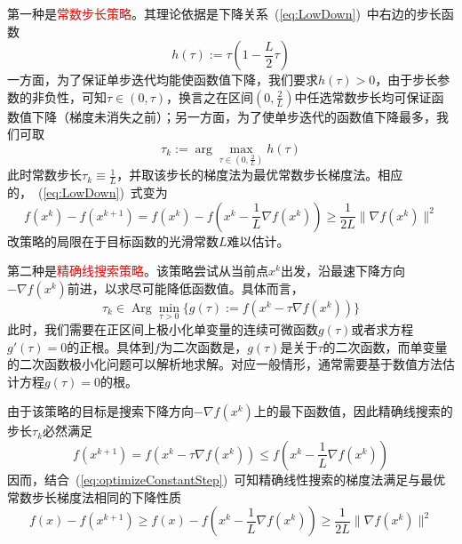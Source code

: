第一种是\textcolor{red}{常数步长策略}。其理论依据是下降关系~(\ref{eq:LowDown})~中右边的步长函数
\[
    h(\tau) :=\tau(1-\frac{L}{2}\tau)   
\]
一方面，为了保证单步迭代均能使函数值下降，我们要求$h(\tau)>0$，由于步长参数的非负性，可知$\tau\in(0,\tau)$，换言之在区间$(0,\frac{2}{L})$中任选常数步长均可保证函数值下降（梯度未消失之前）；另一方面，为了使单步迭代的函数值下降最多，我们可取
\[
    \tau_k:=\arg\max_{\tau\in(0,\frac{2}{L})}h(\tau)    
\]
此时常数步长$\tau_k\equiv \frac{1}{L}$，并取该步长的梯度法为最优常数步长梯度法。相应的，~(\ref{eq:LowDown})~式变为
\begin{equation}\label{eq:optimizeConstantStep}
    f(x^k) - f(x^{k+1}) = f(x^k) - f(x^k-\frac{1}{L}\nabla f(x^k))\geq \frac{1}{2L}\| \nabla f(x^k) \|^2
\end{equation}
改策略的局限在于目标函数的光滑常数$L$难以估计。

第二种是\textcolor{red}{精确线搜索策略}。该策略尝试从当前点$x^k$出发，沿最速下降方向$-\nabla f(x^k)$前进，以求尽可能降低函数值。具体而言，
\[
    \tau_k\in\operatorname*{Arg}\min_{\tau>0}\{ g(\tau):=f(x^k-\tau\nabla f(x^k)) \}
\]
此时，我们需要在正区间上极小化单变量的连续可微函数$g(\tau)$或者求方程$g'(\tau) = 0$的正根。具体到$f$为二次函数是，$g(\tau)$是关于$\tau$的二次函数，而单变量的二次函数极小化问题可以解析地求解。对应一般情形，通常需要基于数值方法估计方程$g(\tau) = 0$的根。

由于该策略的目标是搜索下降方向$-\nabla f(x^k)$上的最下函数值，因此精确线搜索的步长$\tau_k$必然满足
\[
    f(x^{k+1}) = f(x^k-\tau \nabla f(x^k))\leq f(x^k-\dfrac{1}{L}\nabla f(x^k))
\]
因而，结合~(\ref{eq:optimizeConstantStep})~可知精确线性搜索的梯度法满足与最优常数步长梯度法相同的下降性质
\[
    f(x) - f(x^{k+1})\geq f(x) - f(x^k - \dfrac{1}{L}\nabla f(x^k))\geq\dfrac{1}{2L}\| \nabla f(x^k) \|^2 
\]

